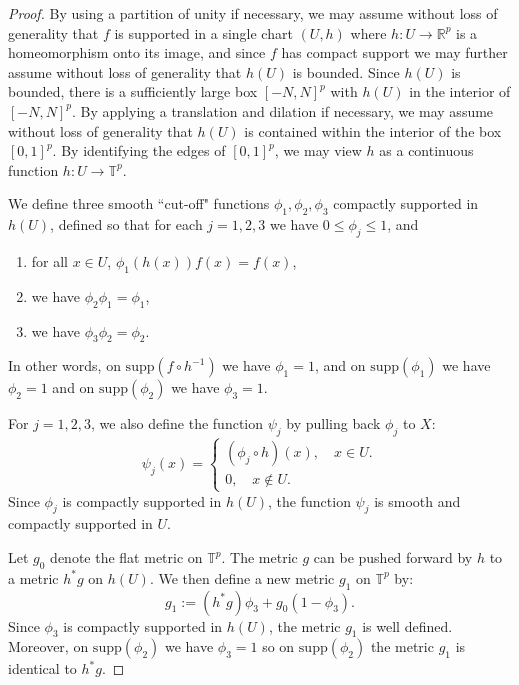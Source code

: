     \begin{proof}
        By using a partition of unity if necessary, we may assume without loss of generality that $f$ is supported in a single chart $(U,h)$ where $h:U\to \mathbb{R}^p$ is a homeomorphism
        onto its image, and since $f$ has compact support we may further assume without loss of generality that $h(U)$ is bounded. Since $h(U)$ is bounded, there is a sufficiently
        large box $[-N,N]^p$ with $h(U)$ in the interior of $[-N,N]^p$. By applying a translation and dilation if necessary, we may assume without loss of generality that $h(U)$
        is contained within the interior of the box $[0,1]^p$. By identifying the edges of $[0,1]^p$, we may view $h$ as a continuous function $h:U\to\mathbb{T}^p$.
        
        We define three smooth ``cut-off" functions $\phi_1,\phi_2,\phi_3$ compactly supported in $h(U)$, defined so that for each $j = 1,2,3$ we have $0\leq \phi_j \leq 1$,
        and
        \begin{enumerate}[{\rm (a)}]
            \item{} for all $x \in U$, $\phi_1(h(x))f(x) = f(x)$,
            \item{} we have $\phi_2\phi_1 = \phi_1$,
            \item{} we have $\phi_3\phi_2 = \phi_2$.
        \end{enumerate}
        In other words, on $\mathrm{supp}(f\circ h^{-1})$ we have $\phi_1=1$, and on $\mathrm{supp}(\phi_1)$ we have $\phi_2 = 1$ and on $\mathrm{supp}(\phi_2)$ we have $\phi_3 = 1$.
        
        For $j = 1,2,3$, we also define the function $\psi_j$ by pulling back $\phi_j$ to $X$:
        \begin{equation*}
            \psi_j(x) = \begin{cases}
                                    (\phi_j\circ h)(x),\quad x\in U.\\
                                    0,\quad x\notin U.
                                \end{cases}
        \end{equation*}
        Since $\phi_j$ is compactly supported in $h(U)$, the function $\psi_j$ is smooth and compactly supported in $U$.
        
        Let $g_0$ denote the flat metric on $\mathbb{T}^p$.
        The metric $g$ can be pushed forward by $h$ to a metric $h^*g$ on $h(U)$. We then define a new metric $g_1$ on $\mathbb{T}^p$ by:
        \begin{equation*}
            g_1 := (h^*g)\phi_3+g_0(1-\phi_3).
        \end{equation*}        
        Since $\phi_3$ is compactly supported in $h(U)$, the metric $g_1$ is well defined. Moreover, on $\mathrm{supp}(\phi_2)$ we have $\phi_3 = 1$ so on $\mathrm{supp}(\phi_2)$ the metric
        $g_1$ is identical to $h^*g$.
        

\end{proof}
